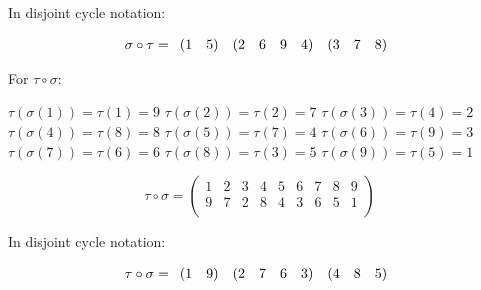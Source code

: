 \documentclass[a4paper]{article}
\begin{document}
\begin{myparindent}{0pt}
In disjoint cycle notation:

\[
    \noindent \sigma \circ \tau = \begin{array}{rr} (1 & 5) \end{array}
    \noindent \begin{array}{rrrrr} (2 & 6 & 9 & 4) \end{array}
    \noindent \begin{array}{rrr} (3 & 7 & 8) \end{array}
\]


For $\tau \circ \sigma$:

$\tau(\sigma(1)) = \tau(1) = 9$ \newline
$\tau(\sigma(2)) = \tau(2) = 7$ \newline
$\tau(\sigma(3)) = \tau(4) = 2$ \newline
$\tau(\sigma(4)) = \tau(8) = 8$ \newline
$\tau(\sigma(5)) = \tau(7) = 4$ \newline
$\tau(\sigma(6)) = \tau(9) = 3$ \newline
$\tau(\sigma(7)) = \tau(6) = 6$ \newline
$\tau(\sigma(8)) = \tau(3) = 5$ \newline
$\tau(\sigma(9)) = \tau(5) = 1$ \newline

\[
    \tau \circ \sigma =
    \begin{pmatrix}
        1 & 2 & 3 & 4 & 5 & 6 & 7 & 8 & 9 \\
        9 & 7 & 2 & 8 & 4 & 3 & 6 & 5 & 1 \\
    \end{pmatrix}
\]

In disjoint cycle notation:

\[
    \noindent \tau \circ \sigma = \begin{array}{rr} (1 & 9) \end{array}
    \noindent \begin{array}{rrrrr} (2 & 7 & 6 & 3) \end{array}
    \noindent \begin{array}{rrr} (4 & 8 & 5) \end{array}
\]

\end{myparindent}
\end{document}
